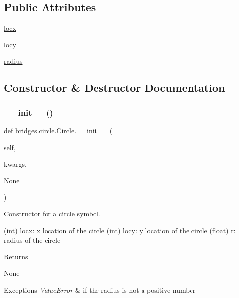 \subsection*{Public Attributes}
\begin{DoxyCompactItemize}
\item 
\hyperlink{classbridges_1_1circle_1_1_circle_a23b8dd93569e14abc63c41aa78e4c1a6}{locx}
\item 
\hyperlink{classbridges_1_1circle_1_1_circle_a2f2e3b85639957633057eb0d0bbdd190}{locy}
\item 
\hyperlink{classbridges_1_1circle_1_1_circle_ab52ae32c28ea4175b815a7b04491205b}{radius}
\end{DoxyCompactItemize}


\subsection{Constructor \& Destructor Documentation}
\mbox{\label{classbridges_1_1circle_1_1_circle_a04dfb68bb632534cf715e2ce927cc76a}} 
\subsubsection{\texorpdfstring{\+\_\+\+\_\+init\+\_\+\+\_\+()}{\_\_init\_\_()}}
{\footnotesize\ttfamily def bridges.\+circle.\+Circle.\+\_\+\+\_\+init\+\_\+\+\_\+ (\begin{DoxyParamCaption}\item[{}]{self,  }\item[{}]{kwargs,  }\item[{}]{None }\end{DoxyParamCaption})}



Constructor for a circle symbol. 

(int) locx\+: x location of the circle (int) locy\+: y location of the circle (float) r\+: radius of the circle \begin{DoxyReturn}{Returns}


None
\end{DoxyReturn}

\begin{DoxyExceptions}{Exceptions}
{\em Value\+Error} & if the radius is not a positive number \\
\hline
\end{DoxyExceptions}


